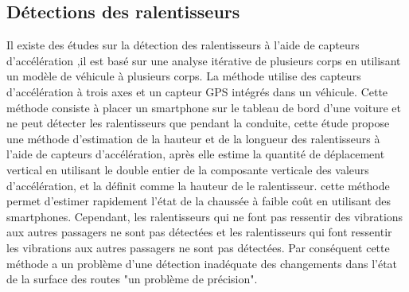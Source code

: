 \subsection{Détections des ralentisseurs}
Il existe des études sur la détection des ralentisseurs à l'aide de capteurs d'accélération \cite{nomuraMethodEstimatingRoad2015},il est basé sur une analyse itérative de plusieurs corps en utilisant un modèle de véhicule à plusieurs corps. La méthode \cite{nomuraMethodEstimatingRoad2015} utilise des capteurs d'accélération à trois axes et un capteur GPS intégrés dans un véhicule.\newline
Cette méthode consiste à placer un smartphone sur le tableau de bord d'une voiture et ne peut détecter les ralentisseurs que pendant la conduite, cette étude propose une méthode d'estimation de la hauteur et de la longueur des ralentisseurs à l'aide de capteurs d'accélération, après elle estime la quantité de déplacement vertical en utilisant le double entier de la composante verticale des valeurs d'accélération, et la définit comme la hauteur de le ralentisseur. cette méthode permet d'estimer rapidement l'état de la chaussée à faible coût en utilisant des smartphones. Cependant, les ralentisseurs qui ne font pas ressentir des vibrations aux autres passagers ne sont pas détectées et les ralentisseurs qui font ressentir les vibrations aux autres passagers ne sont pas détectées.\newline
Par conséquent cette méthode a un problème d'une détection inadéquate des changements dans l'état de la surface des routes "un problème de précision".




\renewcommand {\thesection}{\thechapter.\arabic{section}}